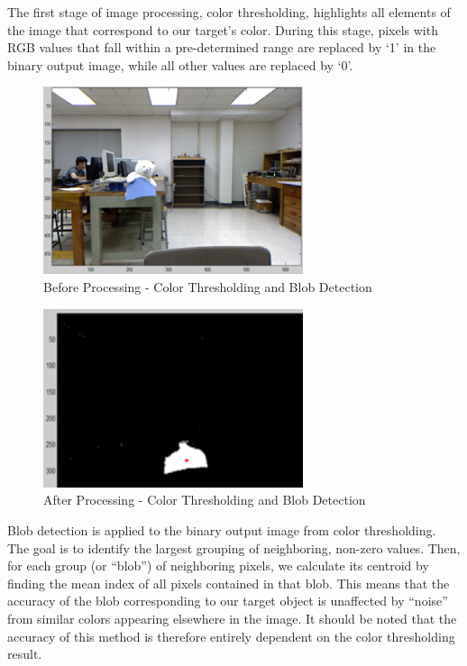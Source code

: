 \documentclass[conference]{IEEEtran}
\begin{document}
The first stage of image processing, color thresholding, highlights all elements of the image that correspond to our target’s color.  During this stage, pixels with RGB values that fall within a pre-determined range are replaced by ‘1’ in the binary output image, while all other values are replaced by ‘0’.  
\begin{figure}[htbp]
\begin{center}
\includegraphics[width=3in]{4}
\caption{Before Processing - Color Thresholding and Blob Detection} \label{fig:4}
\end{center}
\end{figure}

\begin{figure}[htbp]
\begin{center}
\includegraphics[width=3in]{5}
\caption{After Processing - Color Thresholding and Blob Detection} \label{fig:5}
\end{center}
\end{figure}
Blob detection is applied to the binary output image from color thresholding.  The goal is to identify the largest grouping of neighboring, non-zero values.  Then, for each group (or “blob”) of neighboring pixels, we calculate its centroid by finding the mean index of all pixels contained in that blob.  This means that the accuracy of the blob corresponding to our target object is unaffected by “noise” from similar colors appearing elsewhere in the image.  It should be noted that the accuracy of this method is therefore entirely dependent on the color thresholding result.  
\end{document}
